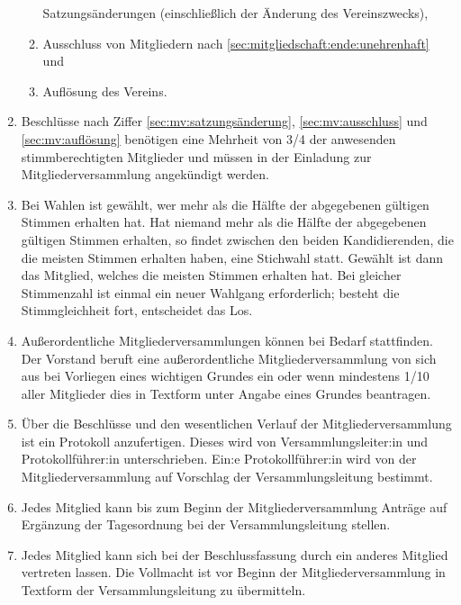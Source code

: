 \documentclass[12pt,paper=a4,ngerman]{scrreprt}
\begin{document}
\begin{enumerate}
\begin{enumerate}
                    Satzungsänderungen (einschließlich der Änderung des Vereinszwecks),
                \item
                    \label{sec:mv:ausschluss}
                    Ausschluss von Mitgliedern nach \ref{sec:mitgliedschaft:ende:unehrenhaft} und
                \item
                    \label{sec:mv:auflösung}
                    Auflösung des Vereins.
            \end{enumerate}
        \item
            Beschlüsse nach Ziffer \ref{sec:mv:satzungsänderung}, \ref{sec:mv:ausschluss} und \ref{sec:mv:auflösung} benötigen eine Mehrheit von 3/4 der anwesenden stimmberechtigten Mitglieder und müssen in der Einladung zur Mitgliederversammlung angekündigt werden.
        \item
            Bei Wahlen ist gewählt, wer mehr als die Hälfte der abgegebenen gültigen Stimmen erhalten hat. Hat niemand mehr als die Hälfte der abgegebenen gültigen Stimmen erhalten, so findet zwischen den beiden Kandidierenden, die die meisten Stimmen erhalten haben, eine Stichwahl statt. Gewählt ist dann das Mitglied, welches die meisten Stimmen erhalten hat. Bei gleicher Stimmenzahl ist einmal ein neuer Wahlgang erforderlich; besteht die Stimmgleichheit fort, entscheidet das Los.
        \item
            Außerordentliche Mitgliederversammlungen können bei Bedarf stattfinden. Der Vorstand beruft eine außerordentliche Mitgliederversammlung von sich aus bei Vorliegen eines wichtigen Grundes ein oder wenn mindestens 1/10 aller Mitglieder dies in Textform unter Angabe eines Grundes beantragen.
        \item
            Über die Beschlüsse und den wesentlichen Verlauf der Mitgliederversammlung ist ein Protokoll anzufertigen. Dieses wird von Versammlungsleiter:in und Protokollführer:in unterschrieben. Ein:e Protokollführer:in wird von der Mitgliederversammlung auf Vorschlag der Versammlungsleitung bestimmt.
        \item
            Jedes Mitglied kann bis zum Beginn der Mitgliederversammlung Anträge auf Ergänzung der Tagesordnung bei der Versammlungsleitung stellen.
        \item
            Jedes Mitglied kann sich bei der Beschlussfassung durch ein anderes Mitglied vertreten lassen. Die Vollmacht ist vor Beginn der Mitgliederversammlung in Textform der Versammlungsleitung zu übermitteln.
	\end{enumerate}
	
\end{document}
